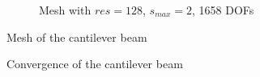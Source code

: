 \begin{figure}[h!]
\begin{subfigure}[b]{1\linewidth}
{            }
            \caption{Mesh with $res=128$, $s_{max}=2$, 1658 DOFs}
        \end{subfigure}
        \caption[Mesh of the cantilever beam]{Mesh of the cantilever beam}
        \label{qdt_fig:ex_cantilever_mesh_all}
    \end{figure}


    \begin{figure}[H]
        \centering
        \caption[Convergence of the cantilever beam]{Convergence of the cantilever beam}
        \label{qdt_fig:ex_cantilever_mesh_conv}
    \end{figure}

    
\pagebreak